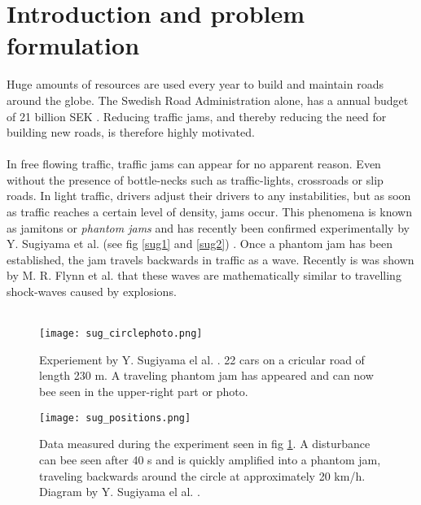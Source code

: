 \section{Introduction and problem formulation}

Huge amounts of resources are used every year to build and maintain roads
around the globe. The Swedish Road Administration alone, has a annual budget
of 21 billion SEK \cite{vagverket}. Reducing traffic jams, and thereby
reducing the need for building new roads, is therefore highly motivated.\\\\

In free flowing traffic, traffic jams can appear for no apparent reason. Even
without the presence of bottle-necks such as traffic-lights, crossroads or
slip roads. In light traffic, drivers adjust their drivers to any
instabilities, but as soon as traffic reaches a certain level of density, jams
occur. This phenomena is known as jamitons or \emph{phantom jams} and has
recently been confirmed experimentally by Y. Sugiyama et al. (see fig
\ref{sug1} and \ref{sug2}) \cite{sugiyama}. Once a phantom jam has been
established, the jam travels backwards in traffic as a wave. Recently is was
shown by M. R. Flynn et al. \cite{mit} that these waves are mathematically
similar to travelling shock-waves caused by explosions.\\\\


\begin{figure}[h]
    \begin{center}
    \texttt{[image: sug\_circlephoto.png]}
    \caption{\label{sug_photo}
Experiement by Y. Sugiyama el al. \cite{sugiyama}. 22 cars on a cricular road
of length 230 m. A traveling phantom jam has appeared and can now bee seen in
the upper-right part or photo.
} \end{center} \end{figure}

\begin{figure}[h]
    \begin{center}
    \texttt{[image: sug\_positions.png]}
    \caption{\label{sug_positions}
Data measured during the experiment seen in fig \ref{sug_photo}. A disturbance
can bee seen after 40 s and is quickly amplified into a phantom jam, traveling
backwards around the circle at approximately 20 km/h.
Diagram by Y. Sugiyama el al. \cite{sugiyama}.}
\end{center} \end{figure}

